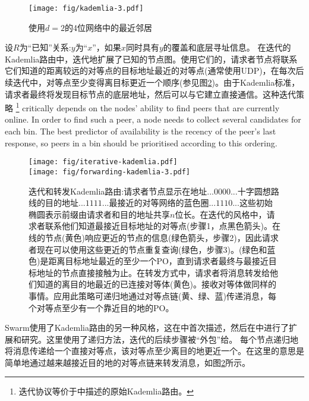 \begin{figure}[htbp]
   \centering
    \texttt{[image: fig/kademlia-3.pdf]}
   \caption[最近的邻居\statusgreen]{使用$d = 2$的4位网络中的最近邻居 }
   \label{fig:bin-density}
\end{figure}

设$R$为“已知”关系:$y$为“$x$”，如果$x$同时具有$y$的覆盖和底层寻址信息。
在迭代的Kademlia路由中，迭代地扩展了已知的节点图。使用它们的，请求者节点将联系它们知道的距离较远的对等点的目标地址最近的对等点(通常使用UDP)，在每次后续迭代中，对等点至少变得离目标更近一个顺序(参见图\ref{fig:iterative-forwarding-kademlia})。由于Kademlia标准，请求者最终将发现目标节点的底层地址，然后可以与它建立直接通信。这种迭代策略%
%
\footnote{迭代协议等价于\cite{maymounkov2002kademlia}中描述的原始Kademlia路由。
}
%
critically depends on the nodes' ability to find peers that are currently online. In order to find such a peer, a node needs to collect several candidates for each bin. The best predictor of availability is the recency of the peer's last response, so peers in a bin should be prioritised according to this ordering.

\begin{figure}[htbp]
   \centering
   \vspace{-2cm} 
   \texttt{[image: fig/iterative-kademlia.pdf]} \\\vspace{-1.3cm}
   \texttt{[image: fig/forwarding-kademlia-3.pdf]}
   \caption[迭代和转发Kademlia路由\statusgreen]{迭代和转发Kademlia路由:请求者节点显示在地址$...0000...$十字圆想路线的目的地址$...1111...$最接近的对等网络的蓝色圈$...1110...$这些初始椭圆表示前缀由请求者和目的地址共享$n$位长。在迭代的风格中，请求者联系他们知道最接近目标地址的对等点(步骤1，点黑色箭头)。在线的节点(黄色)响应更近的节点的信息(绿色箭头，步骤2)，因此请求者现在可以使用这些更近的节点重复查询(绿色，步骤3)。(绿色和蓝色)是距离目标地址最近的至少一个PO，直到请求者最终与最接近目标地址的节点直接接触为止。在转发方式中，请求者将消息转发给他们知道的离目的地最近的已连接对等体(黄色)。接收对等体做同样的事情。应用此策略可递归地通过对等点链(黄、绿、蓝)传递消息，每个对等点至少有一个靠近目的地的PO。}
   \label{fig:iterative-forwarding-kademlia}
\end{figure}


Swarm使用了Kademlia路由的另一种风格，这在\cite{heep2010r}中首次描述，然后在\cite{tronetal2019-network}中进行了扩展和研究。这里使用了递归方法，迭代的后续步骤被“外包”给。
每个节点递归地将消息传递给一个直接对等点，该对等点至少离目的地更近一个。在这里的意思是简单地通过越来越接近目的地的对等点链来转发消息，如图\ref{fig:iterative-forwarding-kademlia}所示。


